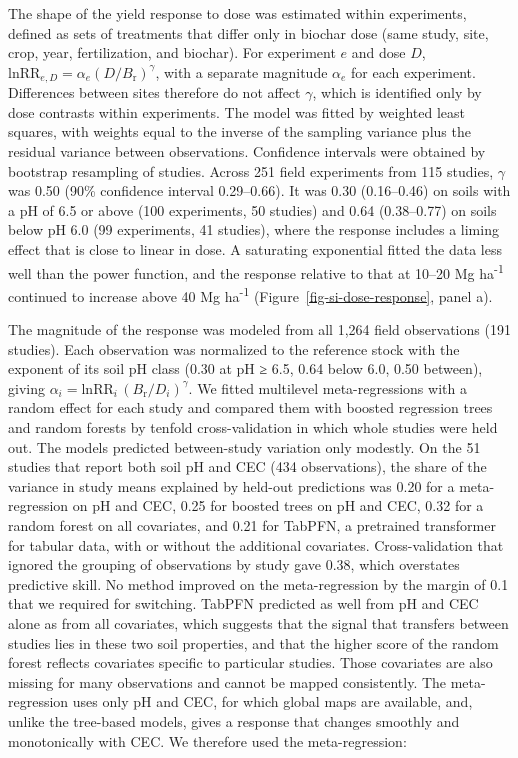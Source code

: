 \documentclass[
  letterpaper,
  twoside,
  twocolumn,
  9pt]{article}
\begin{document}
The shape of the yield response to dose was estimated within
experiments, defined as sets of treatments that differ only in biochar
dose (same study, site, crop, year, fertilization, and biochar). For
experiment \(e\) and dose \(D\),
\(\mathrm{lnRR}_{e,D} = \alpha_e (D/B_{\mathrm{r}})^{\gamma}\), with a
separate magnitude \(\alpha_e\) for each experiment. Differences between
sites therefore do not affect \(\gamma\), which is identified only by
dose contrasts within experiments. The model was fitted by weighted
least squares, with weights equal to the inverse of the sampling
variance plus the residual variance between observations. Confidence
intervals were obtained by bootstrap resampling of studies. Across 251
field experiments from 115 studies, \(\gamma\) was 0.50 (90\% confidence
interval 0.29--0.66). It was 0.30 (0.16--0.46) on soils with a pH of 6.5
or above (100 experiments, 50 studies) and 0.64 (0.38--0.77) on soils
below pH 6.0 (99 experiments, 41 studies), where the response includes a
liming effect that is close to linear in dose. A saturating exponential
fitted the data less well than the power function, and the response
relative to that at 10--20 Mg ha\textsuperscript{-1} continued to
increase above 40 Mg ha\textsuperscript{-1}
(Figure~\ref{fig-si-dose-response}, panel a).

The magnitude of the response was modeled from all 1,264 field
observations (191 studies). Each observation was normalized to the
reference stock with the exponent of its soil pH class (0.30 at pH ≥
6.5, 0.64 below 6.0, 0.50 between), giving
\(\alpha_i = \mathrm{lnRR}_i\, (B_{\mathrm{r}}/D_i)^{\gamma}\). We
fitted multilevel meta-regressions with a random effect for each study
and compared them with boosted regression trees and random forests by
tenfold cross-validation in which whole studies were held out. The
models predicted between-study variation only modestly. On the 51
studies that report both soil pH and CEC (434 observations), the share
of the variance in study means explained by held-out predictions was
0.20 for a meta-regression on pH and CEC, 0.25 for boosted trees on pH
and CEC, 0.32 for a random forest on all covariates, and 0.21 for
TabPFN, a pretrained transformer for tabular data,\citep{hollmann2025}
with or without the additional covariates. Cross-validation that ignored
the grouping of observations by study gave 0.38, which overstates
predictive skill. No method improved on the meta-regression by the
margin of 0.1 that we required for switching. TabPFN predicted as well
from pH and CEC alone as from all covariates, which suggests that the
signal that transfers between studies lies in these two soil properties,
and that the higher score of the random forest reflects covariates
specific to particular studies. Those covariates are also missing for
many observations and cannot be mapped consistently. The meta-regression
uses only pH and CEC, for which global maps are available, and, unlike
the tree-based models, gives a response that changes smoothly and
monotonically with CEC. We therefore used the meta-regression:
\end{document}
